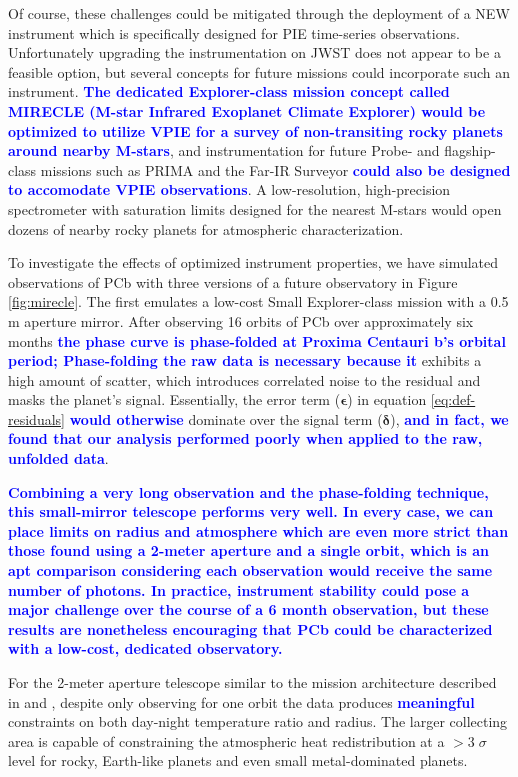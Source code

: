\documentclass[twocolumn,linenumbers]{aastex7}
\newcommand{\update}[1]{\textcolor{blue}{\bf #1}}
\begin{document}
Of course, these challenges could be mitigated through the deployment of a NEW instrument which is specifically designed for PIE time-series observations. Unfortunately upgrading the instrumentation on JWST does not appear to be a feasible option, but several concepts for future missions could incorporate such an instrument. \update{The dedicated Explorer-class mission concept called MIRECLE (M-star Infrared Exoplanet Climate Explorer) \citep{staguhn2019,mandell2022} would be optimized to utilize VPIE for a survey of non-transiting rocky planets around nearby M-stars}, and instrumentation for future Probe- and flagship-class missions such as PRIMA and the Far-IR Surveyor \update{could also be designed to accomodate VPIE observations}. A low-resolution, high-precision spectrometer with saturation limits designed for the nearest M-stars would open dozens of nearby rocky planets for atmospheric characterization.

To investigate the effects of optimized instrument properties, we have simulated observations of PCb with three versions of a future observatory in Figure \ref{fig:mirecle}. The first emulates a low-cost Small Explorer-class mission with a 0.5 m aperture mirror. After observing 16 orbits of PCb over approximately six months \update{the phase curve is phase-folded at Proxima Centauri b's orbital period; Phase-folding the raw data is necessary because it}
exhibits a high amount of scatter, which introduces correlated noise to the residual and masks the planet's signal. Essentially, the error term ($\bm{\epsilon}$) in equation \ref{eq:def-residuals} \update{would otherwise} dominate over the signal term ($\bm{\delta}$), \update{and in fact, we found that our analysis performed poorly when applied to the raw, unfolded data}.

\update{Combining a very long observation and the phase-folding technique, this small-mirror telescope performs very well. In every case, we can place limits on radius and atmosphere which are even more strict than those found using a 2-meter aperture and a single orbit, which is an apt comparison considering each observation would receive the same number of photons. In practice, instrument stability could pose a major challenge over the course of a 6 month observation, but these results are nonetheless encouraging that PCb could be characterized with a low-cost, dedicated observatory.}


For the 2-meter aperture telescope similar to the mission architecture described in \citet{staguhn2019} and \citet{mandell2022}, despite only observing for one orbit the data produces \update{meaningful} constraints on both day-night temperature ratio and radius. The larger collecting area is capable of constraining the atmospheric heat redistribution at a $>3\;\sigma$ level for rocky, Earth-like planets and even small metal-dominated planets.
\end{document}
